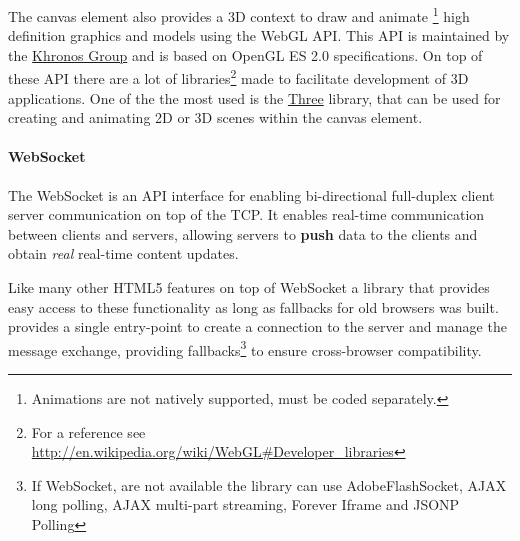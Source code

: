 The canvas element also provides a 3D context to draw and animate
\footnote{Animations are not natively supported, must be coded separately.}
high definition graphics and models using the WebGL API. This API is maintained
by the \href{http://www.khronos.org/}{Khronos Group} and is based on OpenGL ES
2.0 specifications. On top of these API there are a lot of libraries\footnote{For
a reference see \url{http://en.wikipedia.org/wiki/WebGL\#Developer_libraries}}
made to facilitate development of 3D applications. One of the the most used is
the \href{http://mrdoob.github.com/three.js/}{Three} \js{} library, that can be
used for creating and animating 2D or 3D scenes within the canvas element.








\paragraph{WebSocket}
The WebSocket is an API interface for enabling bi-directional full-duplex client
server communication on top of the \ac{TCP}. It enables real-time
communication between clients and servers, allowing servers to \textbf{push} data
to the clients and obtain \emph{real} real-time content updates.

Like many other \ac{HTML}5 features on top of WebSocket a library that
provides easy access to these functionality as long as fallbacks for old browsers
was built.
 provides a single entry-point to create a connection to the
server and manage the message exchange, providing fallbacks\footnote{If WebSocket,
are not available the library can use Adobe\reg Flash\reg Socket, AJAX long
polling, AJAX multi-part streaming, Forever Iframe and JSONP Polling} to ensure
cross-browser compatibility.





